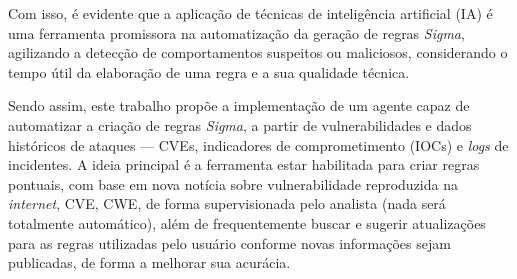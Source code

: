 Com isso, é evidente que a aplicação de técnicas de inteligência artificial (IA) é uma ferramenta promissora na automatização da geração de regras \textit{Sigma}, agilizando a detecção de comportamentos suspeitos ou maliciosos, considerando o tempo útil da elaboração de uma regra e a sua qualidade técnica. 

Sendo assim, este trabalho propõe a implementação de um agente capaz de automatizar a criação de regras \textit{Sigma}, 
a partir de vulnerabilidades e dados históricos de ataques --- \gls{CVE}s, 
indicadores de comprometimento (IOCs) e \textit{logs} de incidentes. 
A ideia principal é a ferramenta estar habilitada para criar regras pontuais, com base em nova notícia sobre vulnerabilidade reproduzida na \textit{internet}, CVE, CWE, de forma supervisionada pelo analista (nada será totalmente automático),
além de frequentemente buscar e sugerir atualizações para as regras utilizadas pelo usuário conforme novas informações sejam publicadas, de forma a melhorar sua acurácia.


